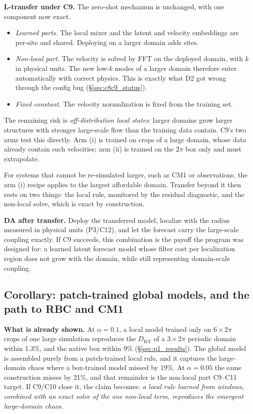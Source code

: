 \documentclass[11pt]{article}
\begin{document}
\textbf{L-transfer under C9.} The zero-shot mechanism is unchanged, with
one component now exact.
\begin{itemize}[leftmargin=*]
\item \emph{Learned parts.} The local mixer and the latent and velocity
  embeddings are per-site and shared. Deploying on a larger domain adds
  sites.
\item \emph{Non-local part.} The velocity is solved by FFT on the
  deployed domain, with $k$ in physical units. The new low-$k$ modes of a
  larger domain therefore enter automatically with correct physics. This
  is exactly what D2 got wrong through the config bug
  (\S\ref{sec:c8c9_status}).
\item \emph{Fixed constant.} The velocity normalization is fixed from the
  training set.
\end{itemize}
The remaining risk is \emph{off-distribution local states}: larger
domains grow larger structures with stronger large-scale flow than the
training data contain. C9's two arms test this directly. Arm (i) is
trained on crops of a large domain, whose data already contain such
velocities; arm (ii) is trained on the $2\pi$ box only and must
extrapolate.

For systems that cannot be re-simulated larger, such as CM1 or
observations, the arm (i) recipe applies to the largest affordable
domain. Transfer beyond it then rests on two things: the local rule,
monitored by the residual diagnostic, and the non-local solve, which is
exact by construction.

\textbf{DA after transfer.} Deploy the transferred model, localize with
the radius measured in physical units (P3/C12), and let the forecast
carry the large-scale coupling exactly. If C9 succeeds, this combination
is the payoff the program was designed for: a learned latent forecast
model whose filter cost per localization region does not grow with the
domain, while still representing domain-scale coupling.

\subsection{Corollary: patch-trained global models, and the path to RBC and CM1}
\label{sec:corollary_cm1}

\textbf{What is already shown.} At $\alpha{=}0.1$, a local model trained
only on $6\times2\pi$ crops of one large simulation reproduces the
$D_{\mathrm{KY}}$ of a $3\times2\pi$ periodic domain within 1.3\%, and the
native box within 9\% (\S\ref{sec:p1_results}). The global model is
assembled purely from a patch-trained local rule, and it captures the
large-domain chaos where a box-trained model missed by 19\%. At
$\alpha{=}0.05$ the same construction misses by 21\%, and that
remainder is the non-local part C9--C11 target. If C9/C10 close it, the
claim becomes: \emph{a local rule learned from windows, combined with an
exact solve of the one non-local term, reproduces the emergent
large-domain chaos.}
\end{document}
